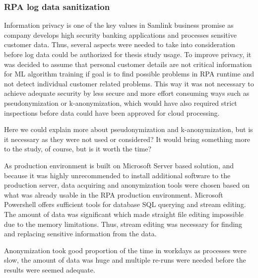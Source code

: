\subsubsection*{RPA log data sanitization}
Information privacy is one of the key values in Samlink business promise
as company develops high security banking applications
and processes sensitive customer data.
Thus, several aspects were needed to take into consideration
before log data could be authorized for thesis study usage.
To improve privacy,
it was decided to assume
that personal customer details are not critical information
for ML algorithm training
if goal is to find possible problems in RPA runtime
and not detect individual customer related problems.
This way it was not necessary to achieve adequate security
by less secure and more effort consuming ways
such as pseudonymization or k-anonymization,
which would have also required strict inspections
before data could have been approved for cloud processing.
\begin{itcomment}
    Here we could explain more about pseudonymization and k-anonymization,
    but is it necessary as they were not used or considered?
    It would bring something more to the study, of course,
    but is it worth the time?
\end{itcomment}

As production environment is built on Microsoft Server based solution,
and because it was highly unrecommended
to install additional software to the production server,
data acquiring and anonymization tools were chosen
based on what was already usable in the RPA production environment.
Microsoft Powershell offers sufficient tools
for database SQL querying
and stream editing.
The amount of data was significant
which made straight file editing impossible
due to the memory limitations.
Thus, stream editing was necessary
for finding and replacing
sensitive information from the data.

Anonymization took good proportion of the time in workdays
as processes were slow,
the amount of data was huge
and multiple re-runs were needed
before the results were seemed adequate.


